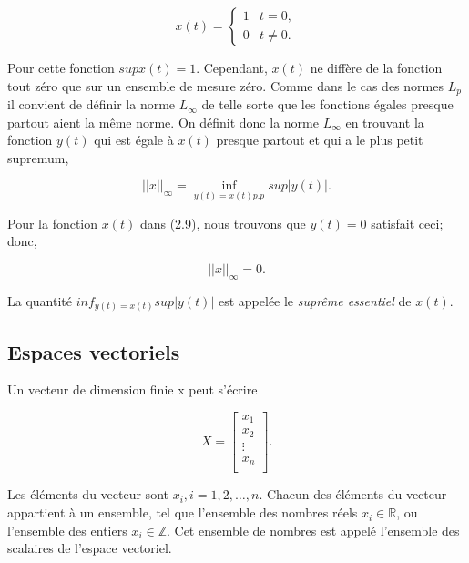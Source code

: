 \documentclass[10pt,twoside,a4paper]{book}
\begin{document}
\begin{enumerate}
  \begin{equation}
    x(t) = \begin{cases} 1 & t = 0, \\
      0 &  t \neq 0.
          \end{cases}
  \end{equation}

  \noindent
  Pour cette fonction $sup x(t) = 1$. Cependant, $x(t)$ ne diffère de la fonction tout zéro que sur un ensemble de mesure zéro. Comme dans le cas des normes $L_p$ il convient de définir la norme $L_\infty$ de telle sorte que les fonctions égales presque partout aient la même norme. 
  On définit donc la norme $L_\infty$ en trouvant la fonction $y(t)$ qui est égale à $x(t)$ presque partout et qui a le plus petit supremum,

  \begin{equation*}
    ||x||_{\infty} = \inf_{y(t)=x(t) p.p} sup |y(t)|.
  \end{equation*}

  \noindent
  Pour la fonction $x(t)$ dans (2.9), nous trouvons que $y(t) = 0$ satisfait ceci; donc,

  \begin{equation*}
    ||x||_{\infty} = 0.
  \end{equation*}

  \noindent
  La quantité $inf_{y(t)=x(t)} sup |y(t)|$ est appelée le \textit{suprême essentiel} de $x(t)$.
\end{enumerate}

\subsection{Espaces vectoriels}

\noindent
Un vecteur de dimension finie x peut s'écrire

\begin{equation*}
  X = \begin{bmatrix}
    x_1 \\
    x_2 \\
    \vdots \\
    x_n \\
  \end{bmatrix}.
\end{equation*}


\noindent
Les éléments du vecteur sont $x_i,i = 1, 2, \ldots, n$. 
Chacun des éléments du vecteur appartient à un ensemble, tel que l'ensemble des nombres réels $x_i \in \mathbb{R}$, ou l'ensemble des entiers $x_i \in \mathbb{Z}$. 
Cet ensemble de nombres est appelé l'ensemble des scalaires de l'espace vectoriel.
\end{document}
